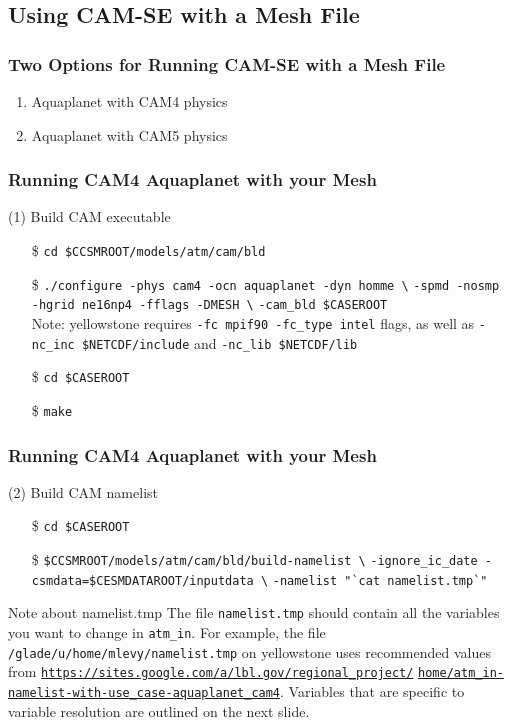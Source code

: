 \documentclass{beamer}
\begin{document}
\subsection{Using CAM-SE with a Mesh File}
\begin{frame}
\frametitle{Two Options for Running CAM-SE with a Mesh File}
\begin{block}{}
\begin{enumerate}
\item Aquaplanet with CAM4 physics
\item Aquaplanet with CAM5 physics
\end{enumerate}
\end{block}
\end{frame}
%
\begin{frame}[containsverbatim]
\frametitle{Running CAM4 Aquaplanet with your Mesh}
\begin{block}{(1) Build CAM executable}
\begin{itemize}
\item[\$] \verb|cd $CCSMROOT/models/atm/cam/bld|
\item[\$] \verb|./configure -phys cam4 -ocn aquaplanet -dyn homme \|
               \verb|-spmd -nosmp -hgrid ne16np4 -fflags -DMESH \| \verb|-cam_bld $CASEROOT| \\
Note: yellowstone requires \verb|-fc mpif90 -fc_type intel| flags, as well as \verb|-nc_inc $NETCDF/include| and \verb|-nc_lib $NETCDF/lib|
\item[\$] \verb|cd $CASEROOT|
\item[\$] \verb|make|
\end{itemize}
\end{block}
\end{frame}
%
\begin{frame}[containsverbatim]
\frametitle{Running CAM4 Aquaplanet with your Mesh}
\begin{block}{(2) Build CAM namelist}
\begin{itemize}
\item[\$] \verb|cd $CASEROOT|
\item[\$] \verb|$CCSMROOT/models/atm/cam/bld/build-namelist \|
\verb|-ignore_ic_date -csmdata=$CESMDATAROOT/inputdata \|
\verb|-namelist "`cat namelist.tmp`"|
\end{itemize}
\end{block}
\begin{block}{Note about namelist.tmp}
The file \verb|namelist.tmp| should contain all the variables you want to change in \verb|atm_in|. For example, the file \verb|/glade/u/home/mlevy/namelist.tmp| on yellowstone uses recommended values from \href{https://sites.google.com/a/lbl.gov/regional_project/home/atm_in-namelist-with-use_case-aquaplanet_cam4}{\texttt{https://sites.google.com/a/lbl.gov/regional\_project/}}
\href{https://sites.google.com/a/lbl.gov/regional_project/home/atm_in-namelist-with-use_case-aquaplanet_cam4}{\texttt{home/atm\_in-namelist-with-use\_case-aquaplanet\_cam4}}. Variables that are specific to variable resolution are outlined on the next slide.
\end{block}
\end{frame}
\end{document}
